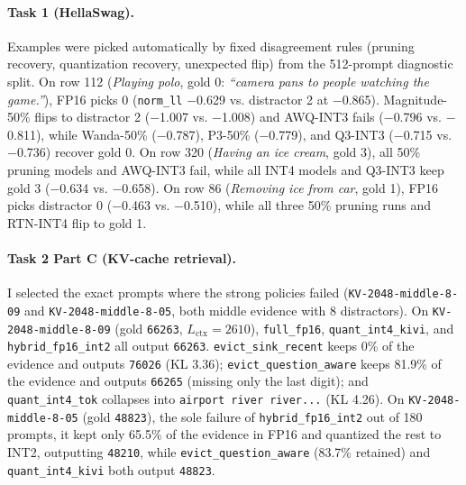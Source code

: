 \documentclass{article}
\begin{document}
\paragraph{Task 1 (HellaSwag).}
Examples were picked automatically by fixed disagreement rules (pruning recovery, quantization recovery, unexpected flip) from the 512-prompt diagnostic split. On row 112 (\emph{Playing polo}, gold 0: \emph{``camera pans to people watching the game.''}), FP16 picks 0 (\texttt{norm\_ll} $-$0.629 vs. distractor 2 at $-$0.865). Magnitude-50\% flips to distractor 2 ($-$1.007 vs. $-$1.008) and AWQ-INT3 fails ($-$0.796 vs. $-$0.811), while Wanda-50\% ($-$0.787), P3-50\% ($-$0.779), and Q3-INT3 ($-$0.715 vs. $-$0.736) recover gold 0. On row 320 (\emph{Having an ice cream}, gold 3), all 50\% pruning models and AWQ-INT3 fail, while all INT4 models and Q3-INT3 keep gold 3 ($-$0.634 vs. $-$0.658). On row 86 (\emph{Removing ice from car}, gold 1), FP16 picks distractor 0 ($-$0.463 vs. $-$0.510), while all three 50\% pruning runs and RTN-INT4 flip to gold 1.

\paragraph{Task 2 Part C (KV-cache retrieval).}
I selected the exact prompts where the strong policies failed (\texttt{KV-2048-middle-8-09} and \texttt{KV-2048-middle-8-05}, both middle evidence with 8 distractors). On \texttt{KV-2048-middle-8-09} (gold \texttt{66263}, $L_{\text{ctx}}=2610$), \texttt{full\_fp16}, \texttt{quant\_int4\_kivi}, and \texttt{hybrid\_fp16\_int2} all output \texttt{66263}. \texttt{evict\_sink\_recent} keeps 0\% of the evidence and outputs \texttt{76026} (KL 3.36); \texttt{evict\_question\_aware} keeps 81.9\% of the evidence and outputs \texttt{66265} (missing only the last digit); and \texttt{quant\_int4\_tok} collapses into \texttt{airport river river...} (KL 4.26). On \texttt{KV-2048-middle-8-05} (gold \texttt{48823}), the sole failure of \texttt{hybrid\_fp16\_int2} out of 180 prompts, it kept only 65.5\% of the evidence in FP16 and quantized the rest to INT2, outputting \texttt{48210}, while \texttt{evict\_question\_aware} (83.7\% retained) and \texttt{quant\_int4\_kivi} both output \texttt{48823}.
\end{document}
